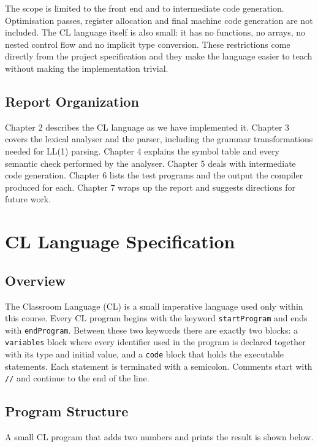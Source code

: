 \documentclass[12pt,a4paper]{report}
\begin{document}
The scope is limited to the front end and to intermediate code generation. Optimisation passes, register allocation and final machine code generation are not included. The CL language itself is also small: it has no functions, no arrays, no nested control flow and no implicit type conversion. These restrictions come directly from the project specification and they make the language easier to teach without making the implementation trivial.

\section{Report Organization}

Chapter 2 describes the CL language as we have implemented it. Chapter 3 covers the lexical analyser and the parser, including the grammar transformations needed for LL(1) parsing. Chapter 4 explains the symbol table and every semantic check performed by the analyser. Chapter 5 deals with intermediate code generation. Chapter 6 lists the test programs and the output the compiler produced for each. Chapter 7 wraps up the report and suggests directions for future work.

\chapter{CL Language Specification}

\section{Overview}

The Classroom Language (CL) is a small imperative language used only within this course. Every CL program begins with the keyword \texttt{startProgram} and ends with \texttt{endProgram}. Between these two keywords there are exactly two blocks: a \texttt{variables} block where every identifier used in the program is declared together with its type and initial value, and a \texttt{code} block that holds the executable statements. Each statement is terminated with a semicolon. Comments start with \texttt{//} and continue to the end of the line.

\section{Program Structure}

A small CL program that adds two numbers and prints the result is shown below.
\end{document}
